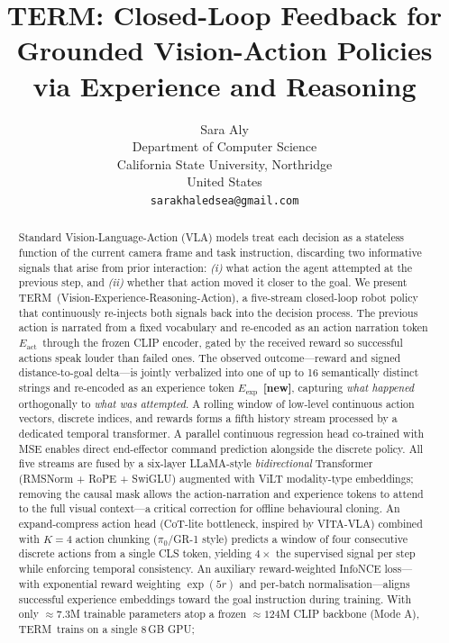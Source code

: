 \documentclass{article}
\title{TERM: Closed-Loop Feedback for Grounded Vision-Action Policies
       via Experience and Reasoning}
\author{
  Sara Aly\\
  Department of Computer Science\\
  California State University, Northridge\\
  United States\\
  \texttt{sarakhaledsea@gmail.com}
}
\newcommand{\modelname}{\textsc{TERM}\xspace}
\newcommand{\Lact}{$E_{\mathrm{act}}$\xspace}
\newcommand{\Lexp}{$E_{\mathrm{exp}}$\xspace}
\newcommand{\NEW}{\textcolor{NewOrange}{\textbf{[new]}}\xspace}
\begin{document}
\maketitle

\begin{abstract}
Standard Vision-Language-Action (VLA) models treat each decision as a
stateless function of the current camera frame and task instruction,
discarding two informative signals that arise from prior interaction:
\emph{(i)} what action the agent attempted at the previous step, and
\emph{(ii)} whether that action moved it closer to the goal.
We present \modelname\ (Vision-Experience-Reasoning-Action), a
five-stream closed-loop robot policy that continuously re-injects both
signals back into the decision process.
The previous action is narrated from a fixed vocabulary and
re-encoded as an action narration token \Lact\ through the frozen CLIP
encoder, gated by the received reward so successful actions speak
louder than failed ones.
The observed outcome---reward and signed distance-to-goal delta---is
jointly verbalized into one of up to 16 semantically distinct strings
and re-encoded as an experience token \Lexp\ \NEW, capturing
\emph{what happened} orthogonally to \emph{what was attempted}.
A rolling window of low-level continuous action vectors, discrete
indices, and rewards forms a fifth history stream processed by a
dedicated temporal transformer.
A parallel continuous regression head co-trained with MSE enables
direct end-effector command prediction alongside the discrete policy.
All five streams are fused by a six-layer LLaMA-style
\emph{bidirectional} Transformer (RMSNorm + RoPE + SwiGLU) augmented
with ViLT modality-type embeddings; removing the causal mask allows the
action-narration and experience tokens to attend to the full visual
context---a critical correction for offline behavioural cloning.
An expand-compress action head (CoT-lite bottleneck, inspired by
VITA-VLA) combined with $K{=}4$ action chunking ($\pi_0$/GR-1 style)
predicts a window of four consecutive discrete actions from a single CLS
token, yielding $4{\times}$ the supervised signal per step while
enforcing temporal consistency.
An auxiliary reward-weighted InfoNCE loss---with exponential reward
weighting $\exp(5r)$ and per-batch normalisation---aligns successful
experience embeddings toward the goal instruction during training.
With only $\approx\!7.3$M trainable parameters atop a frozen
$\approx\!124$M CLIP backbone (Mode A), \modelname\ trains on a single 8\,GB GPU;

\end{abstract}
\end{document}

